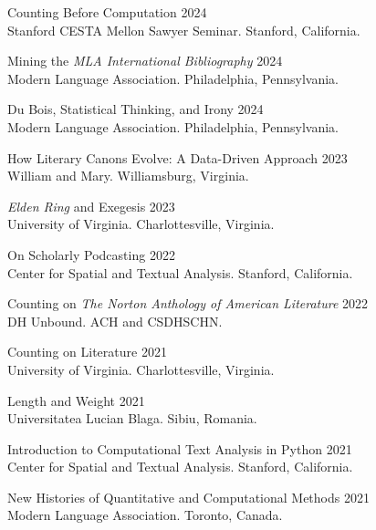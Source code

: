 \documentclass[
  12pt,
  letterpaper,
]{article}
\begin{document}
Counting Before Computation \hfill 2024\\
\hspace*{0.333em} Stanford CESTA Mellon Sawyer Seminar. Stanford, California.

Mining the \emph{MLA International Bibliography} \hfill 2024\\
\hspace*{0.333em} Modern Language Association. Philadelphia, Pennsylvania.

Du Bois, Statistical Thinking, and Irony \hfill 2024\\
\hspace*{0.333em} Modern Language Association. Philadelphia, Pennsylvania.

How Literary Canons Evolve: A Data-Driven Approach \hfill 2023\\
\hspace*{0.333em} William and Mary. Williamsburg, Virginia.

\emph{Elden Ring} and Exegesis \hfill 2023\\
\hspace*{0.333em} University of Virginia. Charlottesville, Virginia.

On Scholarly Podcasting \hfill 2022\\
\hspace*{0.333em} Center for Spatial and Textual Analysis. Stanford,
California.

Counting on \emph{The Norton Anthology of American Literature}
\hfill 2022\\
\hspace*{0.333em} DH Unbound. ACH and CSDH\textbar SCHN.

Counting on Literature \hfill 2021\\
\hspace*{0.333em} University of Virginia. Charlottesville, Virginia.

Length and Weight \hfill 2021\\
\hspace*{0.333em} Universitatea Lucian Blaga. Sibiu, Romania.

Introduction to Computational Text Analysis in Python \hfill 2021\\
\hspace*{0.333em} Center for Spatial and Textual Analysis. Stanford,
California.

New Histories of Quantitative and Computational Methods \hfill 2021\\
\hspace*{0.333em} Modern Language Association. Toronto, Canada.
\end{document}
